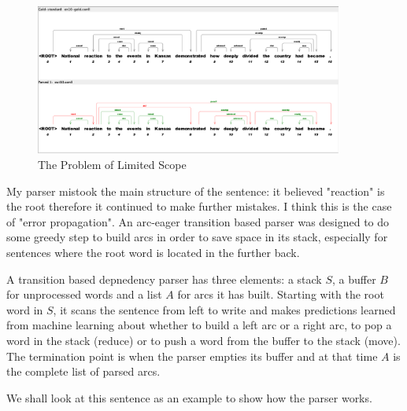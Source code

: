 \documentclass[11pt]{article} %
\begin{document}
\begin{figure}[ht]
  \centering
  \includegraphics[width=0.9\textwidth]{images/figure_limited_scope.png}
  \caption{The Problem of Limited Scope}
  \label{fig1:limitedscope}
\end{figure}

My parser mistook the main structure of the sentence: it believed "reaction" is the root therefore it continued to make further mistakes. I think this is the case of "error propagation". An arc-eager transition based parser was designed to do some greedy step to build arcs in order to save space in its stack, especially for sentences where the root word is located in the further back.

A transition based depnedency parser has three elements: a stack $S$, a buffer $B$ for unprocessed words and a list $A$ for arcs it has built. Starting with the root word in $S$, it scans the sentence from left to write and makes predictions learned from machine learning about whether to build a left arc or a right arc, to pop a word in the stack (reduce) or to push a word from the buffer to the stack (move). The termination point is when the parser empties its buffer and at that time $A$ is the complete list of parsed arcs.

We shall look at this sentence as an example to show how the parser works.
\end{document}
